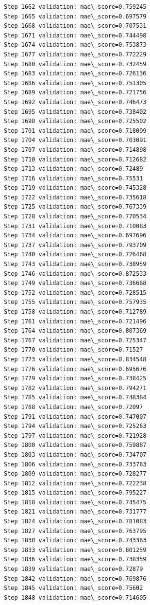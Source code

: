 \documentclass[11pt]{article}
\begin{document}
\begin{Verbatim}[commandchars=\\\{\}]
Step 1662 validation: mae\_score=0.759245
Step 1665 validation: mae\_score=0.697579
Step 1668 validation: mae\_score=0.707531
Step 1671 validation: mae\_score=0.744498
Step 1674 validation: mae\_score=0.753873
Step 1677 validation: mae\_score=0.772229
Step 1680 validation: mae\_score=0.732459
Step 1683 validation: mae\_score=0.726136
Step 1686 validation: mae\_score=0.751305
Step 1689 validation: mae\_score=0.721756
Step 1692 validation: mae\_score=0.746473
Step 1695 validation: mae\_score=0.738402
Step 1698 validation: mae\_score=0.725502
Step 1701 validation: mae\_score=0.718099
Step 1704 validation: mae\_score=0.703091
Step 1707 validation: mae\_score=0.714898
Step 1710 validation: mae\_score=0.712682
Step 1713 validation: mae\_score=0.72489
Step 1716 validation: mae\_score=0.75531
Step 1719 validation: mae\_score=0.745328
Step 1722 validation: mae\_score=0.735618
Step 1725 validation: mae\_score=0.767339
Step 1728 validation: mae\_score=0.770534
Step 1731 validation: mae\_score=0.710083
Step 1734 validation: mae\_score=0.697696
Step 1737 validation: mae\_score=0.793709
Step 1740 validation: mae\_score=0.726468
Step 1743 validation: mae\_score=0.738959
Step 1746 validation: mae\_score=0.872533
Step 1749 validation: mae\_score=0.736668
Step 1752 validation: mae\_score=0.728515
Step 1755 validation: mae\_score=0.757935
Step 1758 validation: mae\_score=0.712789
Step 1761 validation: mae\_score=0.721496
Step 1764 validation: mae\_score=0.807369
Step 1767 validation: mae\_score=0.725347
Step 1770 validation: mae\_score=0.71527
Step 1773 validation: mae\_score=0.834548
Step 1776 validation: mae\_score=0.695676
Step 1779 validation: mae\_score=0.738425
Step 1782 validation: mae\_score=0.794271
Step 1785 validation: mae\_score=0.748384
Step 1788 validation: mae\_score=0.72097
Step 1791 validation: mae\_score=0.747007
Step 1794 validation: mae\_score=0.725263
Step 1797 validation: mae\_score=0.721928
Step 1800 validation: mae\_score=0.759887
Step 1803 validation: mae\_score=0.734707
Step 1806 validation: mae\_score=0.733763
Step 1809 validation: mae\_score=0.728277
Step 1812 validation: mae\_score=0.722238
Step 1815 validation: mae\_score=0.795227
Step 1818 validation: mae\_score=0.745475
Step 1821 validation: mae\_score=0.731777
Step 1824 validation: mae\_score=0.781083
Step 1827 validation: mae\_score=0.763795
Step 1830 validation: mae\_score=0.743363
Step 1833 validation: mae\_score=0.801259
Step 1836 validation: mae\_score=0.738359
Step 1839 validation: mae\_score=0.72879
Step 1842 validation: mae\_score=0.769876
Step 1845 validation: mae\_score=0.75602
Step 1848 validation: mae\_score=0.714605

\end{Verbatim}
\end{document}
